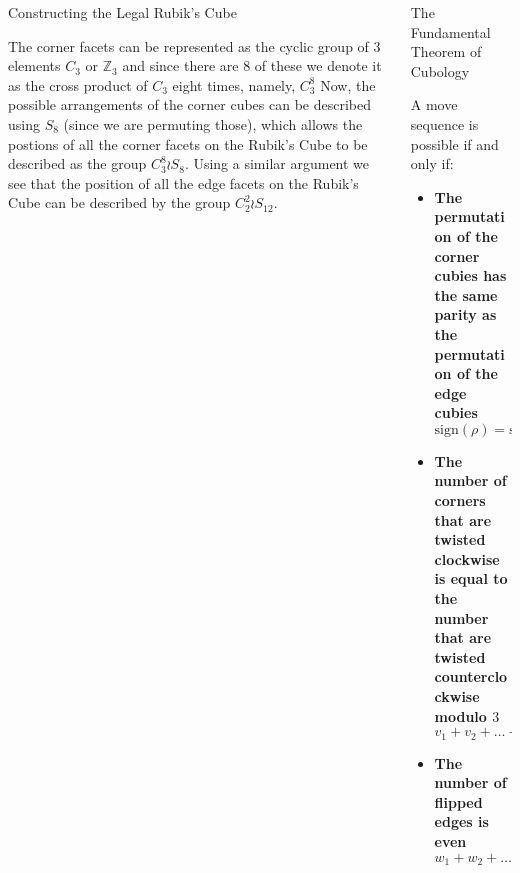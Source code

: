 \documentclass[final]{beamer}
\newlength{\colwidth}
\begin{document}
\begin{frame}[t]
\begin{columns}[t]
\begin{column}{\colwidth}
\begin{block}{Constructing the Legal Rubik's Cube}
    


The corner facets can be represented as the cyclic group of 3 elements $C_{3}$ or $\mathbb Z_3$ and since there are $8$ of these we denote it as the cross product of $C_{3}$ eight times, namely, $C_3 ^8$ 
Now, the possible arrangements of the corner cubes can be described using $S_{8}$ (since we are permuting those), which allows the postions of all the corner facets on the Rubik's Cube to be described as the group $C_{3}^{8} \wr S_{8}$.
Using a similar argument we see that the  position of all the edge facets on the Rubik's Cube can be described by the group $C_{2}^{2} \wr S_{12}$.

  \end{block}

\end{column}

\begin{column}{\colwidth}

  \begin{alertblock}{The Fundamental Theorem of Cubology}
    
    A move sequence is possible if and only if: 

    \begin{itemize}
      \item \textbf{The permutation of the corner cubies has the same parity as the permutation of the edge cubies} 
      $$\text{sign}(\rho) = \text{sign}(\sigma)$$
      \item \textbf{The number of corners that are twisted clockwise is equal to the number that are twisted counterclockwise modulo $3$}
      $$v_{1} + v_{2} +\dots +v_{8} \equiv 0 \mod 3$$
      \item \textbf{The number of flipped edges is even}
      $$w_{1} + w_{2} +\dots +w_{12} \equiv 0 \mod 2$$
    \end{itemize}


\end{alertblock}
\end{column}
\end{columns}
\end{frame}
\end{document}
